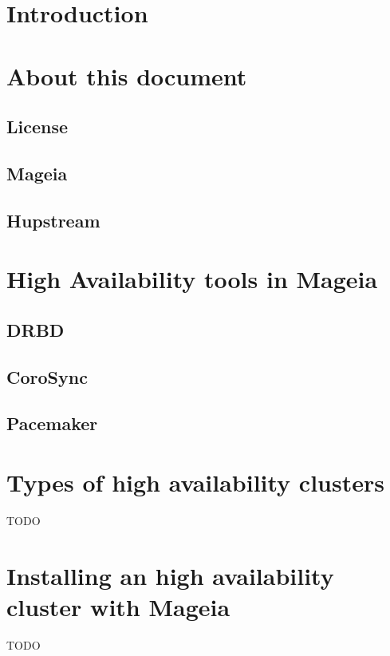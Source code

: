 \documentclass[a4paper,12pt]{article}
\begin{document}
\tableofcontents
\cleardoublepage

\section{Introduction}

\cleardoublepage
\section{About this document}
\subsection{License}
\subsection{Mageia}
\subsection{Hupstream}

\cleardoublepage
\section{High Availability tools in Mageia}
\subsection{DRBD}
\subsection{CoroSync}
\subsection{Pacemaker}

\cleardoublepage
\section{Types of high availability clusters}
TODO

\cleardoublepage
\section{Installing an high availability cluster with Mageia}
TODO

\cleardoublepage
\end{document}
